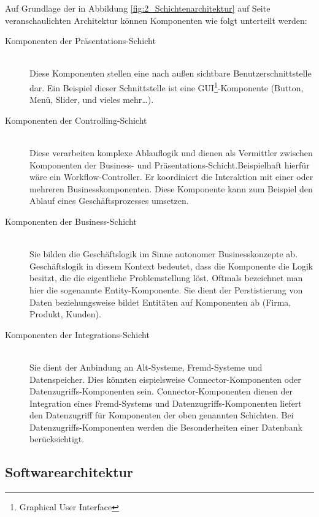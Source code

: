 Auf Grundlage der in Abbildung \ref{fig:2_Schichtenarchitektur} auf Seite \pageref{fig:2_Schichtenarchitektur} veranschaulichten Architektur können Komponenten wie folgt unterteilt werden:
\begin{description}
\item[Komponenten der Präsentations-Schicht] \hfill \\
Diese Komponenten stellen eine nach außen sichtbare Benutzerschnittstelle dar. Ein Beispiel dieser Schnittstelle ist eine GUI\footnote{Graphical User Interface}-Komponente (Button, Menü, Slider, und vieles mehr\ldots).
\item[Komponenten der Controlling-Schicht] \hfill \\
Diese verarbeiten komplexe Ablauflogik und dienen als Vermittler zwischen Komponenten der Business- und Präsentations-Schicht.Beispielhaft hierfür wäre ein Workflow-Controller. Er koordiniert die Interaktion mit einer oder mehreren Businesskomponenten. Diese Komponente kann zum Beispiel den Ablauf eines Geschäftsprozesses umsetzen.
\item[Komponenten der Business-Schicht] \hfill \\
Sie bilden die Geschäftslogik im Sinne autonomer Businesskonzepte ab. Geschäftslogik in diesem Kontext bedeutet, dass die Komponente die Logik besitzt, die die eigentliche Problemstellung löst. Oftmals bezeichnet man hier die sogenannte Entity-Komponente. Sie dient der Perstistierung von Daten beziehungsweise bildet Entitäten auf Komponenten ab (Firma, Produkt, Kunden).
\item[Komponenten der Integrations-Schicht] \hfill \\
Sie dient der Anbindung an Alt-Systeme, Fremd-Systeme und Datenspeicher. Dies könnten eispielsweise Connector-Komponenten oder Datenzugriffs-Komponenten sein. Connector-Komponenten dienen der Integration eines Fremd-Systems und Datenzugriffs-Komponenten liefert den Datenzugriff für Komponenten der oben genannten Schichten. Bei Datenzugriffs-Komponenten werden die Besonderheiten einer Datenbank berücksichtigt.
\end{description}

\subsection{Softwarearchitektur}
\label{sec:2_Softwarearchitektur}

